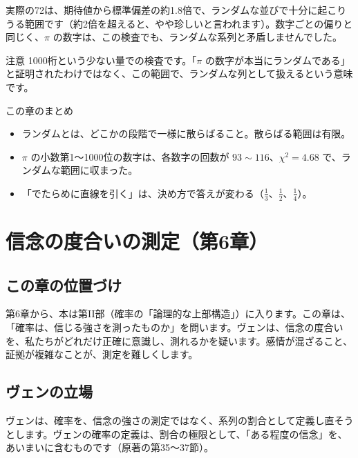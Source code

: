 \documentclass[a4paper,11pt,openany]{ltjsbook}
\begin{document}
実際の72は、期待値から標準偏差の約1.8倍で、ランダムな並びで十分に起こりうる範囲です（約2倍を超えると、やや珍しいと言われます）。数字ごとの偏りと同じく、$\pi$ の数字は、この検査でも、ランダムな系列と矛盾しませんでした。

\begin{notebox}{注意}
1000桁という少ない量での検査です。「$\pi$ の数字が本当にランダムである」と証明されたわけではなく、この範囲で、ランダムな列として扱えるという意味です。
\end{notebox}

\begin{pointbox}{この章のまとめ}
\begin{itemize}[leftmargin=*]
\item ランダムとは、どこかの段階で一様に散らばること。散らばる範囲は有限。
\item $\pi$ の小数第1〜1000位の数字は、各数字の回数が $93\sim116$、$\chi^2=4.68$ で、ランダムな範囲に収まった。
\item 「でたらめに直線を引く」は、決め方で答えが変わる（$\tfrac13$、$\tfrac12$、$\tfrac14$）。
\end{itemize}
\end{pointbox}

\chapter{信念の度合いの測定（第6章）}

\section{この章の位置づけ}

第6章から、本は第II部（確率の「論理的な上部構造」）に入ります。この章は、「確率は、信じる強さを測ったものか」を問います。ヴェンは、信念の度合いを、私たちがどれだけ正確に意識し、測れるかを疑います。感情が混ざること、証拠が複雑なことが、測定を難しくします。

\section{ヴェンの立場}

ヴェンは、確率を、信念の強さの測定ではなく、系列の割合として定義し直そうとします。ヴェンの確率の定義は、割合の極限として、「ある程度の信念」を、あいまいに含むものです（原著の第35〜37節）。
\end{document}
